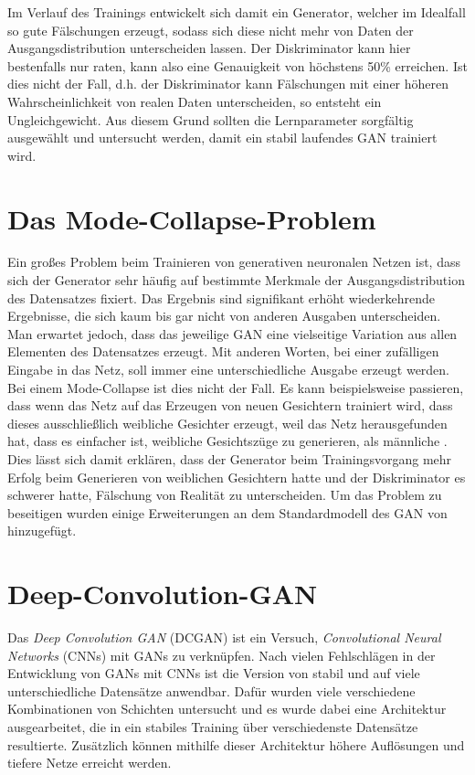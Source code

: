 Im Verlauf des Trainings entwickelt sich damit ein Generator, welcher im
Idealfall so gute Fälschungen erzeugt, sodass sich diese nicht mehr von Daten
der Ausgangsdistribution unterscheiden lassen. Der Diskriminator kann hier
bestenfalls nur raten, kann also eine Genauigkeit von höchstens 50\%
erreichen. Ist dies nicht der Fall, d.h. der Diskriminator kann Fälschungen
mit einer höheren Wahrscheinlichkeit von realen Daten unterscheiden, so
entsteht ein Ungleichgewicht. Aus diesem Grund sollten die Lernparameter
sorgfältig ausgewählt und untersucht werden, damit ein stabil laufendes GAN
trainiert wird.

\section{Das Mode-Collapse-Problem}
Ein großes Problem beim Trainieren von generativen neuronalen Netzen ist, dass
sich der Generator sehr häufig auf bestimmte Merkmale der Ausgangsdistribution
des Datensatzes fixiert. Das Ergebnis sind signifikant erhöht wiederkehrende
Ergebnisse, die sich kaum bis gar nicht von anderen Ausgaben unterscheiden.
Man erwartet jedoch, dass das jeweilige GAN eine vielseitige Variation aus
allen Elementen des Datensatzes erzeugt. Mit anderen Worten, bei einer
zufälligen Eingabe in das Netz, soll immer eine unterschiedliche Ausgabe
erzeugt werden. Bei einem Mode-Collapse ist dies nicht der Fall. Es kann
beispielsweise passieren, dass wenn das Netz auf das Erzeugen von neuen
Gesichtern trainiert wird, dass dieses ausschließlich weibliche Gesichter
erzeugt, weil das Netz herausgefunden hat, dass es einfacher ist, weibliche
Gesichtszüge zu generieren, als männliche \cite{richardson2018gans}. Dies
lässt sich damit erklären, dass der Generator beim Trainingsvorgang mehr
Erfolg beim Generieren von weiblichen Gesichtern hatte und der Diskriminator
es schwerer hatte, Fälschung von Realität zu unterscheiden. Um das Problem zu
beseitigen wurden einige Erweiterungen an dem Standardmodell des GAN von
\cite{goodfellow2014generative} hinzugefügt.

\section{Deep-Convolution-GAN}
Das \textit{Deep Convolution GAN} (DCGAN) ist ein Versuch,
\textit{Convolutional Neural Networks} (CNNs) mit GANs zu verknüpfen. Nach
vielen Fehlschlägen in der Entwicklung von GANs mit CNNs ist die Version von
\cite{radford2016unsupervised} stabil und auf viele unterschiedliche
Datensätze anwendbar. Dafür wurden viele verschiedene Kombinationen von
Schichten untersucht und es wurde dabei eine Architektur ausgearbeitet, die
in ein stabiles Training über verschiedenste Datensätze resultierte.
Zusätzlich können mithilfe dieser Architektur höhere Auflösungen und tiefere
Netze erreicht werden.

